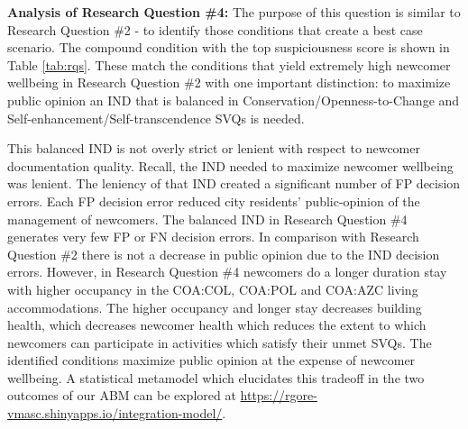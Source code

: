\documentclass{scspaperproc}
\theoremstyle{scsthe}
\begin{document}
\label{sec:rq4}


{\bf Analysis of Research Question \#4:} The purpose of this question is similar to Research Question \#2 - to identify those conditions that create a best case scenario. The compound condition with the top suspiciousness score is shown in Table \ref{tab:rqs}. These match the conditions that yield extremely high newcomer wellbeing in Research Question \#2 with one important distinction: to maximize public opinion an IND that is balanced in Conservation/Openness-to-Change and Self-enhancement/Self-transcendence SVQs is needed. 

This balanced IND is not overly strict or lenient with respect to newcomer documentation quality. Recall, the IND needed to maximize newcomer wellbeing was lenient.  The leniency of that IND created a significant number of FP decision errors. Each FP decision error reduced city residents' public-opinion of the management of newcomers. The balanced IND in Research Question \#4 generates very few FP or FN decision errors. In comparison with Research Question \#2 there is not a decrease in public opinion due to the IND decision errors. However, in Research Question \#4 newcomers do a longer duration stay with higher occupancy in the COA:COL, COA:POL and COA:AZC living accommodations. The higher occupancy and longer stay decreases building health, which decreases newcomer health which reduces the extent to which newcomers can participate in activities which satisfy their unmet SVQs. The identified conditions maximize public opinion at the expense of newcomer wellbeing. A statistical metamodel which elucidates this tradeoff in the two outcomes of our ABM can be explored at \url{https://rgore-vmasc.shinyapps.io/integration-model/}. %
\end{document}
